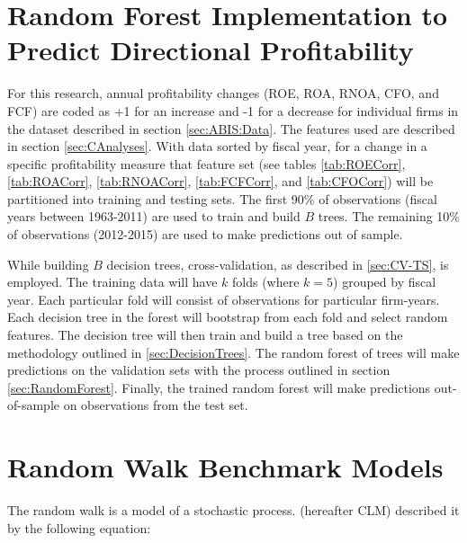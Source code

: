 
\section{Random Forest Implementation to Predict Directional Profitability}

For this research, annual profitability changes (ROE, ROA, RNOA, CFO, and FCF) are coded as +1 for an increase and -1 for a decrease for individual firms in the dataset described in section \ref{sec:ABIS:Data}. The features used are described in section \ref{sec:CAnalyses}. With data sorted by fiscal year, for a change in a specific profitability measure that feature set (see tables \ref{tab:ROECorr},  \ref{tab:ROACorr},  \ref{tab:RNOACorr},  \ref{tab:FCFCorr}, and \ref{tab:CFOCorr}) will be partitioned into training and testing sets. The first 90\% of observations (fiscal years between 1963-2011) are used to train and build \(B\) trees.  The remaining 10\% of observations (2012-2015) are used to make predictions out of sample. 

While building \(B\) decision trees,  cross-validation, as described in \ref{sec:CV-TS}, is employed. The training data will have \(k\) folds (where \(k=5\)) grouped by fiscal year.  Each particular fold will consist of observations for particular firm-years.  Each decision tree in the forest will bootstrap from each fold and select random features. The decision tree will then train and build a tree based on the methodology outlined in \ref{sec:DecisionTrees}. The random forest of trees will make predictions on the validation sets with the process outlined in section \ref{sec:RandomForest}. Finally, the trained random forest will  make predictions out-of-sample on observations from the test set.

\section{Random Walk Benchmark Models} \label{sec:RWModel}

The random walk is a model of a stochastic process.  \cite{Campbell1997} (hereafter CLM)  described it by the following equation: 

